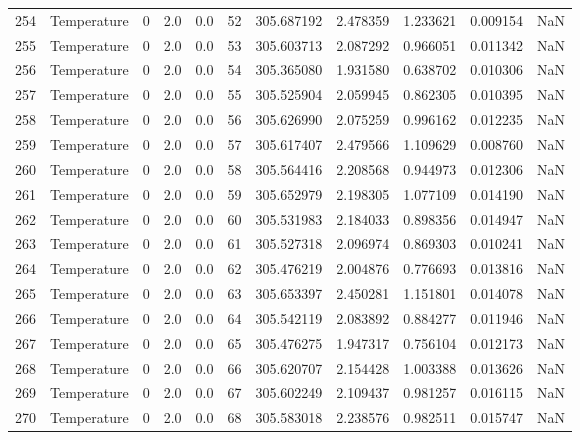 \begin{tabular}{llrrrrrrrrr}
254 &  Temperature &       0 &  2.0 &  0.0 &   52 &  305.687192 &  2.478359 &  1.233621 &   0.009154 &      NaN \\
255 &  Temperature &       0 &  2.0 &  0.0 &   53 &  305.603713 &  2.087292 &  0.966051 &   0.011342 &      NaN \\
256 &  Temperature &       0 &  2.0 &  0.0 &   54 &  305.365080 &  1.931580 &  0.638702 &   0.010306 &      NaN \\
257 &  Temperature &       0 &  2.0 &  0.0 &   55 &  305.525904 &  2.059945 &  0.862305 &   0.010395 &      NaN \\
258 &  Temperature &       0 &  2.0 &  0.0 &   56 &  305.626990 &  2.075259 &  0.996162 &   0.012235 &      NaN \\
259 &  Temperature &       0 &  2.0 &  0.0 &   57 &  305.617407 &  2.479566 &  1.109629 &   0.008760 &      NaN \\
260 &  Temperature &       0 &  2.0 &  0.0 &   58 &  305.564416 &  2.208568 &  0.944973 &   0.012306 &      NaN \\
261 &  Temperature &       0 &  2.0 &  0.0 &   59 &  305.652979 &  2.198305 &  1.077109 &   0.014190 &      NaN \\
262 &  Temperature &       0 &  2.0 &  0.0 &   60 &  305.531983 &  2.184033 &  0.898356 &   0.014947 &      NaN \\
263 &  Temperature &       0 &  2.0 &  0.0 &   61 &  305.527318 &  2.096974 &  0.869303 &   0.010241 &      NaN \\
264 &  Temperature &       0 &  2.0 &  0.0 &   62 &  305.476219 &  2.004876 &  0.776693 &   0.013816 &      NaN \\
265 &  Temperature &       0 &  2.0 &  0.0 &   63 &  305.653397 &  2.450281 &  1.151801 &   0.014078 &      NaN \\
266 &  Temperature &       0 &  2.0 &  0.0 &   64 &  305.542119 &  2.083892 &  0.884277 &   0.011946 &      NaN \\
267 &  Temperature &       0 &  2.0 &  0.0 &   65 &  305.476275 &  1.947317 &  0.756104 &   0.012173 &      NaN \\
268 &  Temperature &       0 &  2.0 &  0.0 &   66 &  305.620707 &  2.154428 &  1.003388 &   0.013626 &      NaN \\
269 &  Temperature &       0 &  2.0 &  0.0 &   67 &  305.602249 &  2.109437 &  0.981257 &   0.016115 &      NaN \\
270 &  Temperature &       0 &  2.0 &  0.0 &   68 &  305.583018 &  2.238576 &  0.982511 &   0.015747 &      NaN \\

\end{tabular}

